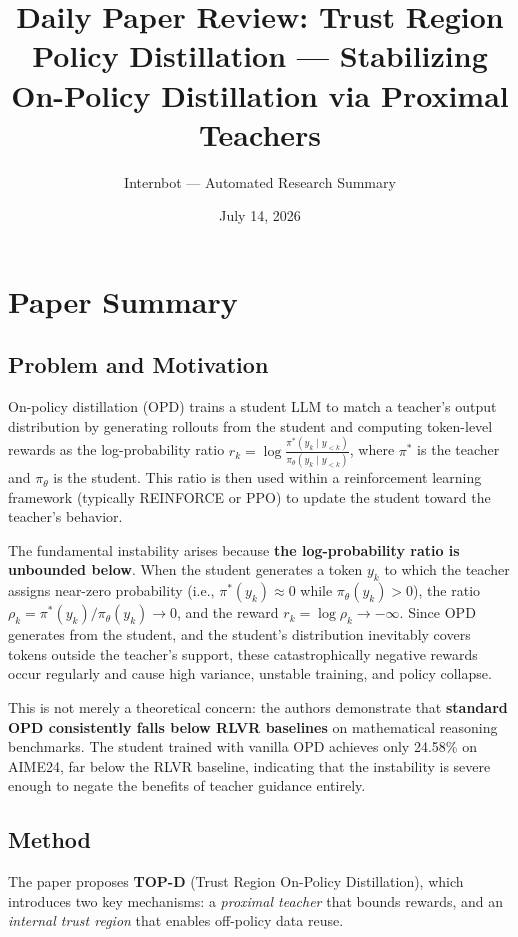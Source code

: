 \documentclass[11pt,a4paper]{article}
\title{Daily Paper Review: Trust Region Policy Distillation --- Stabilizing\\On-Policy Distillation via Proximal Teachers}
\author{Internbot --- Automated Research Summary}
\date{July 14, 2026}
\begin{document}
\maketitle

\section{Paper Summary}

\subsection{Problem and Motivation}

On-policy distillation (OPD) trains a student LLM to match a teacher's output distribution by generating rollouts from the student and computing token-level rewards as the log-probability ratio $r_k = \log \frac{\pi^*(y_k \mid y_{<k})}{\pi_\theta(y_k \mid y_{<k})}$, where $\pi^*$ is the teacher and $\pi_\theta$ is the student. This ratio is then used within a reinforcement learning framework (typically REINFORCE or PPO) to update the student toward the teacher's behavior.

The fundamental instability arises because \textbf{the log-probability ratio is unbounded below}. When the student generates a token $y_k$ to which the teacher assigns near-zero probability (i.e., $\pi^*(y_k) \approx 0$ while $\pi_\theta(y_k) > 0$), the ratio $\rho_k = \pi^*(y_k)/\pi_\theta(y_k) \to 0$, and the reward $r_k = \log \rho_k \to -\infty$. Since OPD generates from the student, and the student's distribution inevitably covers tokens outside the teacher's support, these catastrophically negative rewards occur regularly and cause high variance, unstable training, and policy collapse.

This is not merely a theoretical concern: the authors demonstrate that \textbf{standard OPD consistently falls below RLVR baselines} on mathematical reasoning benchmarks. The student trained with vanilla OPD achieves only 24.58\% on AIME24, far below the RLVR baseline, indicating that the instability is severe enough to negate the benefits of teacher guidance entirely.

\subsection{Method}

The paper proposes \textbf{TOP-D} (Trust Region On-Policy Distillation), which introduces two key mechanisms: a \emph{proximal teacher} that bounds rewards, and an \emph{internal trust region} that enables off-policy data reuse.
\end{document}

